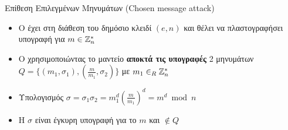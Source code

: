 \documentclass{beamer}
\begin{document}
\begin{frame}{Επίθεση Επιλεγμένων Μηνυμάτων (Chosen message attack)}
\begin{itemize}
\item O \adv έχει στη διάθεση του δημόσιο κλειδί $(e,n)$ και θέλει να πλαστογραφήσει υπογραφή για $m \in \mathbb{Z}^*_n$
\pause
\item O \adv χρησιμοποιώντας το μαντείο \textbf{αποκτά τις υπογραφές} 2 μηνυμάτων $Q = \{ (m_1, \sigma_1), (\frac{m}{m_1}, \sigma_2) \}$ με $m_1 \in_R \mathbb{Z}^*_n $
\pause
\item Υπολογισμός $\sigma = \sigma_1  \sigma_2 = m_1^d (\frac{m}{m_1})^d = m ^ d \bmod{n}$
\pause
\item H $\sigma$ είναι έγκυρη υπογραφή για το $m$ και $\not \in Q$
\end{itemize}
\end{frame}
\end{document}
